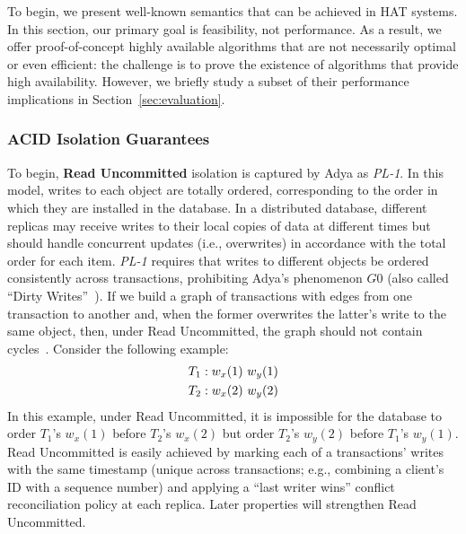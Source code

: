 To begin, we present well-known semantics that can be achieved in HAT
systems. In this section, our primary goal is feasibility, not
performance. As a result, we offer proof-of-concept highly available
algorithms that are not necessarily optimal or even efficient: the
challenge is to prove the existence of algorithms that provide high
availability. However, we briefly study a subset of their performance
implications in Section~\ref{sec:evaluation}.

\subsubsection{ACID Isolation Guarantees}
\label{sec:isolation}

To begin, \textbf{Read Uncommitted} isolation is captured by Adya as
\textit{PL-1}. In this model, writes to each object are totally
ordered, corresponding to the order in which they are installed in the
database. In a distributed database, different replicas may receive
writes to their local copies of data at different times but should
handle concurrent updates (i.e., overwrites) in accordance with the
total order for each item. \textit{PL-1} requires that writes to
different objects be ordered consistently across transactions,
prohibiting Adya's phenomenon $G0$ (also called ``Dirty
Writes''~\cite{ansicritique}). If we build a graph of transactions
with edges from one transaction to another and, when the former
overwrites the latter's write to the same object, then, under Read
Uncommitted, the graph should not contain cycles~\cite{adya}. Consider
the following example:
\begin{align*}
\small\vspace{-1em}
T_1 &: w_x(1)~w_y(1)
\\T_2 &: w_x(2)~w_y(2)
\end{align*}
In this example, under Read Uncommitted, it is impossible for the
database to order $T_1$'s $w_x(1)$ before $T_2$'s $w_x(2)$ but order
$T_2$'s $w_y(2)$ before $T_1$'s $w_y(1)$. Read Uncommitted is easily
achieved by marking each of a transactions' writes with the same
timestamp (unique across transactions; e.g., combining a client's ID
with a sequence number) and applying a ``last writer wins'' conflict
reconciliation policy at each replica. Later properties will
strengthen Read Uncommitted.

